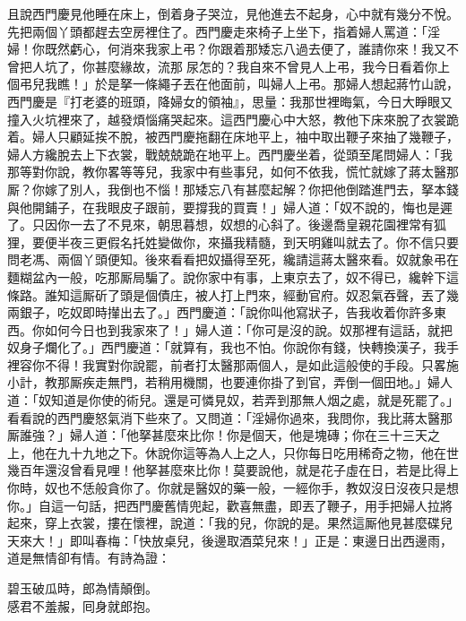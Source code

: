 且說西門慶見他睡在床上，倒着身子哭泣，{}見他進去不起身，心中就有幾分不悅。先把兩個丫頭都趕去空房裡住了。西門慶走來椅子上坐下，指着婦人罵道：「淫婦！你既然虧心，何消來我家上弔？你跟着那矮忘八過去便了，誰請你來！我又不曾把人坑了，你甚麼緣故，流那𣭈尿怎的？我自來不曾見人上弔，我今日看着你上個弔兒我瞧！」於是拏一條繩子丟在他面前，叫婦人上弔。那婦人想起蔣竹山說，西門慶是『打老婆的班頭，降婦女的領袖』，思量：我那世裡晦氣，今日大睜眼又撞入火坑裡來了，越發煩惱痛哭起來。{}這西門慶心中大怒，教他下床來脫了衣裳跪着。婦人只顧延挨不脫，被西門慶拖翻在床地平上，袖中取出鞭子來抽了幾鞭子，{}婦人方纔脫去上下衣裳，戰兢兢跪在地平上。西門慶坐着，從頭至尾問婦人：「我那等對你說，教你畧等等兒，我家中有些事兒，如何不依我，慌忙就嫁了蔣太醫那厮？你嫁了別人，我倒也不惱！那矮忘八有甚麼起解？你把他倒踏進門去，拏本錢與他開鋪子，在我眼皮子跟前，要撐我的買賣！」婦人道：「奴不說的，悔也是遲了。只因你一去了不見來，朝思暮想，奴想的心斜了。後邊喬皇親花園裡常有狐狸，要便半夜三更假名托姓變做你，來攝我精髓，到天明雞叫就去了。你不信只要問老馮、兩個丫頭便知。後來看看把奴攝得至死，纔請這蔣太醫來看。奴就象弔在麵糊盆內一般，吃那厮局騙了。說你家中有事，上東京去了，奴不得已，纔幹下這條路。誰知這厮斫了頭是個債庄，被人打上門來，經動官府。奴忍氣吞聲，丟了幾兩銀子，吃奴即時攆出去了。」{}西門慶道：「說你叫他寫狀子，告我收着你許多東西。{}你如何今日也到我家來了！」婦人道：「你可是沒的說。奴那裡有這話，就把奴身子爛化了。」西門慶道：「就算有，我也不怕。你說你有錢，快轉換漢子，我手裡容你不得！我實對你說罷，前者打太醫那兩個人，是如此這般使的手段。只畧施小計，教那厮疾走無門，若稍用機關，也要連你掛了到官，弄倒一個田地。」婦人道：「奴知道是你使的術兒。還是可憐見奴，若弄到那無人烟之處，就是死罷了。」看看說的西門慶怒氣消下些來了。又問道：「淫婦你過來，我問你，我比蔣太醫那厮誰強？」{}婦人道：「他拏甚麼來比你！你是個天，他是塊磚；你在三十三天之上，他在九十九地之下。休說你這等為人上之人，只你每日吃用稀奇之物，他在世幾百年還沒曾看見哩！他拏甚麼來比你！莫要說他，就是花子虛在日，若是比得上你時，奴也不恁般貪你了。{}你就是醫奴的藥一般，一經你手，教奴沒日沒夜只是想你。」自這一句話，把西門慶舊情兜起，歡喜無盡，即丟了鞭子，用手把婦人拉將起來，穿上衣裳，摟在懷裡，說道：「我的兒，你說的是。果然這厮他見甚麼碟兒天來大！」即叫春梅：「快放桌兒，後邊取酒菜兒來！」正是：東邊日出西邊雨，道是無情卻有情。有詩為證：

\begin{myquote} 
碧玉破瓜時，郎為情顛倒。\\感君不羞赧，囘身就郎抱。
\end{myquote} 

 

